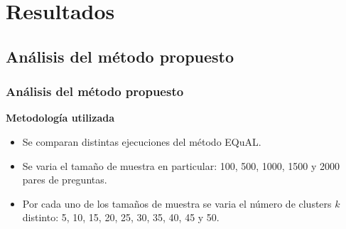 \section{Resultados}

\subsection{Análisis del método propuesto}
\begin{frame}
	\frametitle{Análisis del método propuesto}

	\textbf{Metodología utilizada}
	\bigskip

	\begin{itemize}[<*>]
		\item Se comparan distintas ejecuciones del método EQuAL.
		\item Se varia el tamaño de muestra en particular: 100, 500, 1000, 1500 y 2000 pares de preguntas.
		\item Por cada uno de los tamaños de muestra se varia el número de clusters \(k\) distinto: 5, 10, 15, 20, 25, 30, 35, 40, 45 y 50.
	\end{itemize}

	\framebreak


\end{frame}
